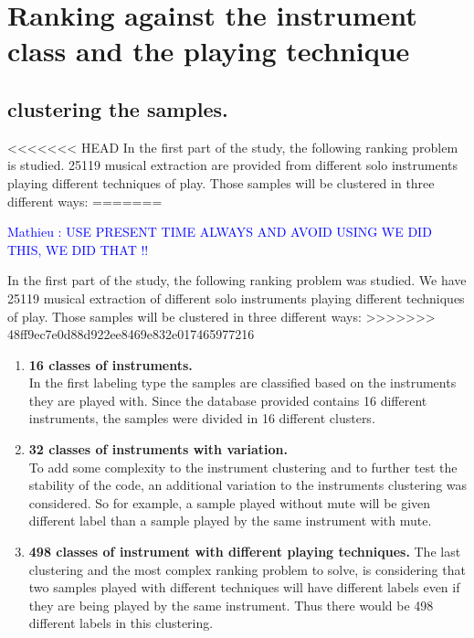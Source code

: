 \documentclass[hidelinks,12pt]{report}
\newcommand{\ml}[1]{\textcolor{blue}{ Mathieu : #1}}
\begin{document}
\chapter{Ranking against the instrument class and the playing technique}
\section{clustering the samples.}
<<<<<<< HEAD
In the first part of the study, the following ranking problem is studied. 25119 musical extraction are provided from different solo instruments playing different techniques of play. Those samples will be clustered in three different ways: 
=======

\ml{USE PRESENT TIME ALWAYS AND AVOID USING WE DID THIS, WE DID THAT !!}

In the first part of the study, the following ranking problem was studied. We have 25119 musical extraction of different solo instruments playing different techniques of play. Those samples will be clustered in three different ways: 
>>>>>>> 48ff9ec7e0d88d922ee8469e832e017465977216
\begin{enumerate}
\item \textbf{ 16 classes of instruments.}\\
In the first labeling type the samples are classified based on the instruments they are played with. Since the database provided contains 16 different instruments, the samples were divided in 16 different clusters.
\item \textbf{32 classes of instruments with variation.}\\
To add some complexity to the instrument clustering and to further test the stability of the code, an additional variation to the instruments clustering was considered. So for example, a sample played without mute will be given different label than a sample played by the same instrument with mute.
\item \textbf{498 classes of instrument with different playing techniques.}
The last clustering and the most complex ranking problem to solve, is considering that two samples played with different techniques will have different labels even if they are being played by the same instrument. Thus there would be 498 different labels in this clustering.\\

\end{enumerate}
\end{document}
